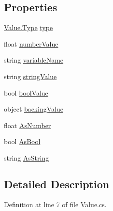 \subsection*{Properties}
\begin{DoxyCompactItemize}
\item 
\hyperlink{a00177_ad5aaf60ee4504608fcc2ffadefa14884}{Value.\-Type} \hyperlink{a00177_a6d5820fafa766911b9da84d1ed33e51a}{type}
\item 
float \hyperlink{a00177_ae1892c1c7a8177537d1caa39a2e51da6}{number\-Value}
\item 
string \hyperlink{a00177_a8ee2b09b7d28eaf97bf63c74d0023bfd}{variable\-Name}
\item 
string \hyperlink{a00177_add1b07146f1a9e4b655b33c93d07dff9}{string\-Value}
\item 
bool \hyperlink{a00177_acb140e3466e132528409d4c441fd67da}{bool\-Value}
\item 
object \hyperlink{a00177_a051dd30c6cb184f1fe941a95be8781ab}{backing\-Value}
\item 
float \hyperlink{a00177_a751419743761562bf902246d6e6a3c0a}{As\-Number}
\item 
bool \hyperlink{a00177_a5805faef3b3d376090ff096d6dd6c064}{As\-Bool}
\item 
string \hyperlink{a00177_a2d5d0ec41c50c642c1d0eeeb6bb2b1c0}{As\-String}
\end{DoxyCompactItemize}


\subsection{Detailed Description}


Definition at line 7 of file Value.\-cs.



